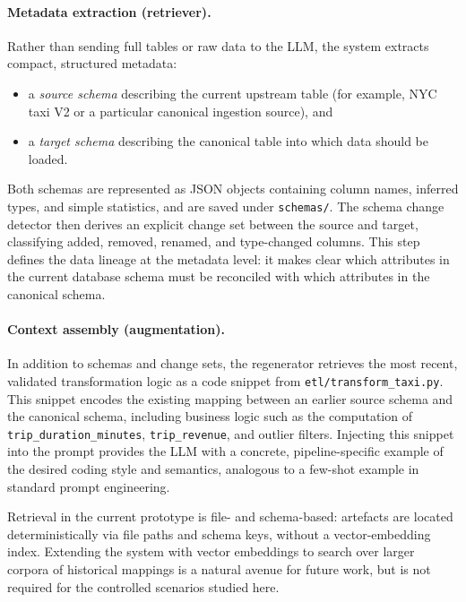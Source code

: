 \paragraph{Metadata extraction (retriever).}
Rather than sending full tables or raw data to the LLM, the system extracts compact, structured
metadata:
%
\begin{itemize}
  \item a \emph{source schema} describing the current upstream table (for example, NYC taxi V2 or a
  particular canonical ingestion source), and
  \item a \emph{target schema} describing the canonical table into which data should be loaded.
\end{itemize}
%
Both schemas are represented as JSON objects containing column names, inferred types, and simple
statistics, and are saved under \texttt{schemas/}. The schema change detector then derives an
explicit change set between the source and target, classifying added, removed, renamed, and
type-changed columns. This step defines the data lineage at the metadata level: it makes clear
which attributes in the current database schema must be reconciled with which attributes in the
canonical schema.

\paragraph{Context assembly (augmentation).}
In addition to schemas and change sets, the regenerator retrieves the most recent, validated
transformation logic as a code snippet from \texttt{etl/transform\_taxi.py}. This snippet
encodes the existing mapping between an earlier source schema and the canonical schema, including
business logic such as the computation of \texttt{trip\_duration\_minutes}, \texttt{trip\_revenue},
and outlier filters. Injecting this snippet into the prompt provides the LLM with a concrete,
pipeline-specific example of the desired coding style and semantics, analogous to a few-shot
example in standard prompt engineering.

Retrieval in the current prototype is file- and schema-based: artefacts are located deterministically
via file paths and schema keys, without a vector-embedding index. Extending the system with vector
embeddings to search over larger corpora of historical mappings is a natural avenue for future work,
but is not required for the controlled scenarios studied here.

